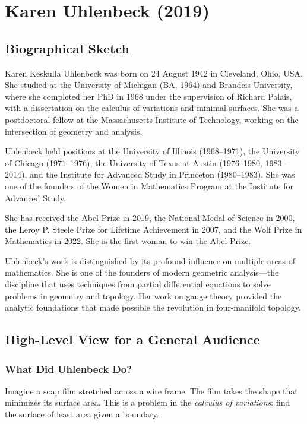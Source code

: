 \chapter{Karen Uhlenbeck (2019)}

\section{Biographical Sketch}

Karen Keskulla Uhlenbeck was born on 24 August 1942 in Cleveland, Ohio, USA. She studied at the University of Michigan (BA, 1964) and Brandeis University, where she completed her PhD in 1968 under the supervision of Richard Palais, with a dissertation on the calculus of variations and minimal surfaces. She was a postdoctoral fellow at the Massachusetts Institute of Technology, working on the intersection of geometry and analysis.

Uhlenbeck held positions at the University of Illinois (1968--1971), the University of Chicago (1971--1976), the University of Texas at Austin (1976--1980, 1983--2014), and the Institute for Advanced Study in Princeton (1980--1983). She was one of the founders of the Women in Mathematics Program at the Institute for Advanced Study.

She has received the Abel Prize in 2019, the National Medal of Science in 2000, the Leroy P. Steele Prize for Lifetime Achievement in 2007, and the Wolf Prize in Mathematics in 2022. She is the first woman to win the Abel Prize.

Uhlenbeck's work is distinguished by its profound influence on multiple areas of mathematics. She is one of the founders of modern geometric analysis---the discipline that uses techniques from partial differential equations to solve problems in geometry and topology. Her work on gauge theory provided the analytic foundations that made possible the revolution in four-manifold topology.

\section{High-Level View for a General Audience}

\subsection{What Did Uhlenbeck Do?}

Imagine a soap film stretched across a wire frame. The film takes the shape that minimizes its surface area. This is a problem in the \emph{calculus of variations}: find the surface of least area given a boundary.

